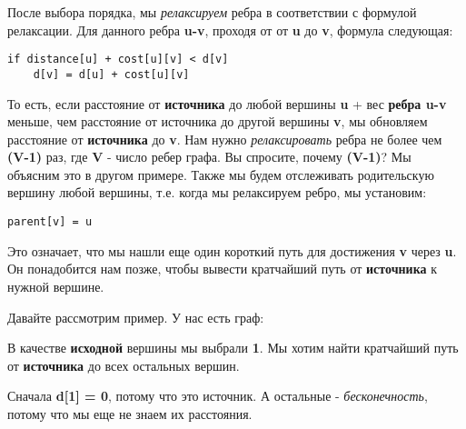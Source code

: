 \vspace{\baselineskip}

После выбора порядка, мы \textit{релаксируем} ребра в соответствии с формулой релаксации. Для данного ребра \textbf{u-v}, проходя от от \textbf{u} до \textbf{v}, формула следующая:

\begin{tcolorbox}
\begin{verbatim}
if distance[u] + cost[u][v] < d[v]
    d[v] = d[u] + cost[u][v]
\end{verbatim}
\end{tcolorbox}


То есть, если расстояние от \textbf{источника} до любой вершины \textbf{u} + вес \textbf{ребра u-v} меньше, чем расстояние от источника до другой вершины \textbf{v}, мы обновляем расстояние от \textbf{источника} до \textbf{v}. Нам нужно \textit{релаксировать} ребра не более чем \textbf{(V-1)} раз, где \textbf{V} - число ребер графа. Вы спросите, почему \textbf{(V-1)}? Мы объясним это в другом примере. Также мы будем отслеживать родительскую вершину любой вершины, т.е. когда мы релаксируем ребро, мы установим:

\begin{tcolorbox}
\begin{verbatim}
parent[v] = u
\end{verbatim}
\end{tcolorbox}

Это означает, что мы нашли еще один короткий путь для достижения \textbf{v} через \textbf{u}. Он понадобится нам позже, чтобы вывести кратчайший путь от \textbf{источника} к нужной вершине.

\vspace{\baselineskip}

Давайте рассмотрим пример. У нас есть граф:

\newpage

\begin{center}
\end{center}

В качестве \textbf{исходной} вершины мы выбрали \textbf{1}. Мы хотим найти кратчайший путь от \textbf{источника} до всех остальных вершин.

\vspace{\baselineskip}

Сначала \textbf{d[1] = 0}, потому что это источник. А остальные - \textit{бесконечность}, потому что мы еще не знаем их расстояния.

